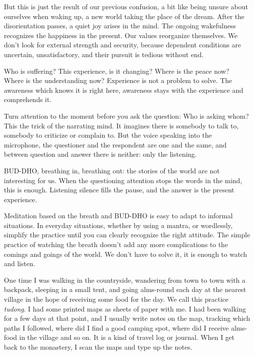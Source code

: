 But this is just the result of our previous confusion, a bit like being
unsure about ourselves when waking up, a new world taking the place of
the dream. After the disorientation passes, a quiet joy arises in the
mind. The ongoing wakefulness recognizes the happiness in the present.
Our values reorganize themselves. We don't look for external strength
and security, because dependent conditions are uncertain,
unsatisfactory, and their pursuit is tedious without end.

Who is suffering? This experience, is it changing? Where is the peace
now? Where is the understanding now? Experience is not a problem to
solve. The awareness which knows it is right here, awareness stays with
the experience and comprehends it.

\enlargethispage*{\baselineskip}

Turn attention to the moment before you ask the question: Who is asking
whom? This the trick of the narrating mind. It imagines there is
somebody to talk to, somebody to criticize or complain to. But the voice
speaking into the microphone, the questioner and the respondent are one
and the same, and between question and answer there is neither: only the
listening.

\clearpage


BUD-DHO, breathing in, breathing out: the stories of the world are not
interesting for us. When the questioning attention stops the words in
the mind, this is enough. Listening silence fills the pause, and the
answer is the present experience.

Meditation based on the breath and BUD-DHO is easy to adapt to informal
situations. In everyday situations, whether by using a mantra, or
wordlessly, simplify the practice until you can clearly recognize the
right attitude. The simple practice of watching the breath doesn't add
any more complications to the comings and goings of the world. We don't
have to solve it, it is enough to watch and listen.


One time I was walking in the countryside, wandering from town to town
with a backpack, sleeping in a small tent, and going alms-round each day
at the nearest village in the hope of receiving some food for the day.
We call this practice \emph{tudong}. I had some printed maps as sheets
of paper with me. I had been walking for a few days at that point, and I
usually write notes on the map, tracking which paths I followed, where
did I find a good camping spot, where did I receive alms-food in the
village and so on. It is a kind of travel log or journal. When I get
back to the monastery, I scan the maps and type up the notes.

